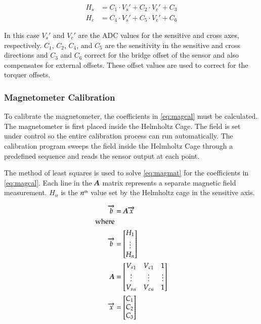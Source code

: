 \begin{equation}
    \label{eq:magcal}
    \begin{split}
        H_s &= C_1 \cdot V_s' + C_2 \cdot V_c' + C_3\\
        H_c &= C_4 \cdot V_s' + C_5 \cdot V_c' + C_6
    \end{split}
\end{equation}

In this case $V_s'$ and $V_c'$ are the \ac{ADC} values for the sensitive and cross axes, respectively. $C_1$, $C_2$, $C_4$, and $C_5$ are the sensitivity in the sensitive and cross directions and $C_3$ and $C_6$ correct for the bridge offset of the sensor and also compensates for external offsets. These offset values are used to correct for the torquer offsets.

\subsubsection{Magnetometer Calibration}
\label{sec:magcal}

To calibrate the magnetometer, the coefficients in \cref{eq:magcal} must be calculated. The magnetometer is first placed inside the Helmholtz Cage. The field is set under \matlab control so the entire calibration process can run automatically. The calibration program sweeps the field inside the Helmholtz Cage through a predefined sequence and reads the sensor output at each point\cite{Frey14}.

The method of least squares is used to solve \cref{eq:magmat} for the coefficients in \cref{eq:magcal}. Each line in the $\boldsymbol{A}$ matrix represents a separate magnetic field measurement. $H_n$ is the $n^{\text{\tiny th}}$ value set by the Helmholtz cage in the sensitive axis. 

\begin{equation}
    \label{eq:magmat}
    \begin{split}
    \vect{b}&=\matt{A} \vect{x} \\
    {\text{\raggedright where}} \\
    \vect{b}&= 
    \begin{bmatrix}
        H_1 \\
        \vdots \\
        H_n \\
    \end{bmatrix} \\
    \matt{A}&=
    \begin{bmatrix}
        {V_s}_1 & {V_c}_1 & 1 \\
        \vdots & \vdots & \vdots\\
        {V_s}_n & {V_c}_n & 1 \\
    \end{bmatrix} \\
    \vect{x}&= 
    \begin{bmatrix}
        C_1 \\
        C_2 \\
        C_3 \\
    \end{bmatrix} 
    \end{split}
\end{equation}

